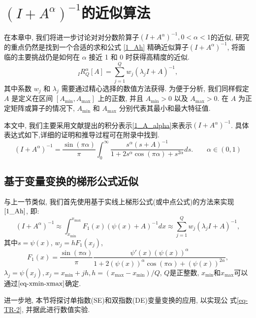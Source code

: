 \chapter{\((I+{A}^{\alpha})^{-1} \)的近似算法}

在本章中, 我们将进一步讨论对对分数阶算子\((I+A^{\alpha})^{-1},0 < \alpha < 1\)的近似, 研究的重点仍然是找到一个合适的求和公式 \eqref{1_Ah} 精确近似算子$(I+A^{\alpha})^{-1}$, 将面临的主要挑战仍是如何在 $\alpha$ 接近 1 和 0 时获得高精度的近似.  
\begin{equation}\label{1_Ah}
	_I R_Q^{\alpha}[A] = \sum_{j=1}^{Q}w_j(\lambda_jI+A)^{-1},
\end{equation}
其中系数 $w_j$ 和 $\lambda_j$ 需要通过精心选择的数值方法获得. 为便于分析, 我们同样假定 $A$ 是定义在区间 $[A_{\min}, A_{\max}]$ 上的正数, 并且 $A_{\min}>0$ 以及 $A_{\max}>0$. 在 $A$ 为正定矩阵或算子的情况下, $A_{\min}$ 和 $A_{\max}$ 分别代表其最小和最大特征值. 

本文中, 我们主要采用文献\cite{Komatsu1966FractionalPO}提出的积分表示\eqref{1_A_alpha}来表示$(I+A^{\alpha})^{-1}$. 具体表达式如下,详细的证明和推导过程可在附录中找到. 
\begin{equation}\label{1_A_alpha}
	(I+A^{\alpha})^{-1} =\frac{\sin( \pi\alpha)}{\pi} \int^{\infty}_{0} 
	\frac{s^{\alpha}(s+A)^{-1}}
	{1+2s^{\alpha}\cos(\pi \alpha)+s^{2\alpha}}  ds. \qquad\alpha \in (0,1)
\end{equation}

\section{基于变量变换的梯形公式近似}
与上一节类似, 我们首先使用基于实线上梯形公式(或中点公式)的方法来实现$\eqref{1_Ah}$, 即:
\begin{equation}\label{eq-TR-2}
	(I+{A}^{\alpha})^{-1}\approx \int^{x_{\max}}_{x_{\min}}F_1(x)(\psi(x)+A)^{-1} dx
	\approx\sum_{j=1}^{Q}w_j(\lambda_jI+A)^{-1}, 
\end{equation}
其中$s=\psi(x)$, $w_j=hF_1(x_j)$, 
\begin{equation}\label{eq-F-q}
	F_1(x)=\frac{\sin(\pi \alpha)}{\pi}
	\frac{\psi'(x)(\psi(x))^{\alpha}}
	{1+2(\psi(x))^{\alpha}\cos(\pi \alpha)+(\psi(x))^{2\alpha}},
\end{equation}
$\lambda_j = \psi(x_j), x_j=x_{\min} + jh,
h = (x_{\max}-x_{\min})/Q$, $Q$是正整数, 
$x_{\min}$和$x_{\max}$可以通过$\eqref{eq-xmin-xmax}$确定. 

进一步地, 本节将探讨单指数(SE)和双指数(DE)变量变换的应用, 以实现公
式\eqref{eq-TR-2}, 并据此进行数值实验. 
